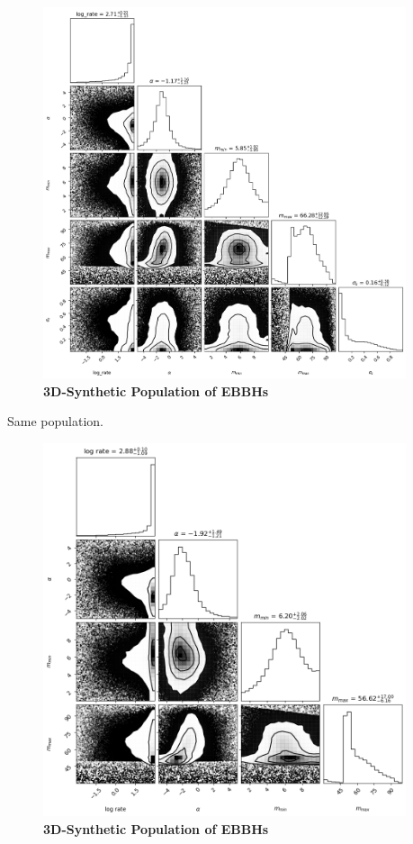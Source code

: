 \documentclass[twocolumn,prd,nofootinbib]{revtex4}
\begin{document}
\begin{figure}

\includegraphics[width=0.95\textwidth]{paper/figures/corner0.05.png}
\caption{\label{fig:pop3d05}\textbf{3D-Synthetic Population of EBBHs}}

\end{figure}
Same population.
\begin{figure}

\includegraphics[width=0.95\textwidth]{paper/figures/corner0.05scl.png}
\caption{\label{fig:pop3d05}\textbf{3D-Synthetic Population of EBBHs}}

\end{figure}
\end{document}
